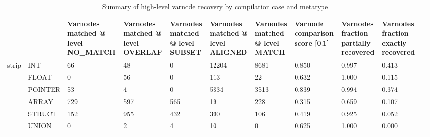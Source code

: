 \begin{table*}[t]
\centering
\caption{Summary of high-level varnode recovery by compilation case and metatype}
\label{table*:opts-varnodes-summary-metatypes}
\begin{tabular}{lp{1.2cm}p{1.2cm}p{1.2cm}p{1.2cm}p{1.2cm}p{1.2cm}p{1.2cm}p{1.2cm}p{1.2cm}p{1.2cm}}
\toprule
      &       &  Varnodes matched @ level NO\_MATCH &  Varnodes matched @ level OVERLAP &  Varnodes matched @ level SUBSET &  Varnodes matched @ level ALIGNED &  Varnodes matched @ level MATCH &  Varnode comparison score [0,1] &  Varnodes fraction partially recovered &  Varnodes fraction exactly recovered \\
\midrule
\multirow{6}{*}{strip} & INT &                                 66 &                                48 &                                0 &                             12204 &                            8681 &                           0.850 &                                  0.997 &                                0.413 \\
      & FLOAT &                                  0 &                                56 &                                0 &                               113 &                              22 &                           0.632 &                                  1.000 &                                0.115 \\
      & POINTER &                                 53 &                                 4 &                                0 &                              5834 &                            3513 &                           0.839 &                                  0.994 &                                0.374 \\
      & ARRAY &                                729 &                               597 &                              565 &                                19 &                             228 &                           0.315 &                                  0.659 &                                0.107 \\
      & STRUCT &                                152 &                               955 &                              432 &                               390 &                             106 &                           0.419 &                                  0.925 &                                0.052 \\
      & UNION &                                  0 &                                 2 &                                4 &                                10 &                               0 &                           0.625 &                                  1.000 &                                0.000 \\

\end{tabular}
\end{table*}
